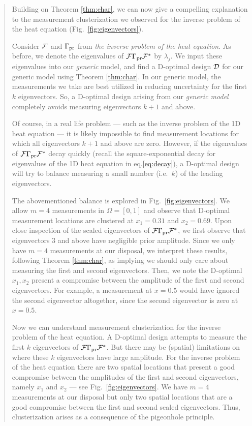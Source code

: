 \begin{quote}
  Building on Theorem \ref{thm:char}, we can now give a compelling
  explanation to the measurement clusterization we observed for the
  inverse problem of the heat equation (Fig.~\ref{fig:eigenvectors}).
    
  Consider $\mathcal{F}$ and $\Gamma_{\textup{pr}}$ from \emph{the inverse problem of the
  heat equation}. As before, we denote the eigenvalues of
  $\mathcal{F}\Gamma_{\textup{pr}}\mathcal{F}^*$ by $\lambda_j$. We input these eigenvalues into
  our \emph{generic} model, and find a D-optimal design $\mathcal{D}$ for our
  generic model using Theorem \ref{thm:char}. In our generic model,
  the measurements we take are best utilized in reducing uncertainty
  for the first $k$ eigenvectors. So, a D-optimal design arising from
  our \emph{generic model} completely avoids measuring eigenvectors
  $k+1$ and above.

  Of course, in a real life problem --- such as the inverse problem of
  the 1D heat equation --- it is likely impossible to find measurement
  locations for which all eigenvectors $k+1$ and above are
  zero. However, if the eigenvalues of $\mathcal{F}\Gamma_{\textup{pr}}\mathcal{F}^*$ decay
  quickly (recall the square-exponential decay for eigenvalues of the
  1D heat equation in eq.\eqref{eq:decay}), a D-optimal design will
  try to balance measuring a small number (i.e.~$k$) of the leading
  eigenvectors.

  The abovementioned balance is explored in
  Fig.~\ref{fig:eigenvectors}. We allow $m=4$ measurements in $\Omega
  = [0,1]$ and observe that D-optimal measurement locations are
  clustered at $x_1 = 0.31$ and $x_2 = 0.69$. Upon close inspection of
  the scaled eigenvectors of $\mathcal{F} \Gamma_{\textup{pr}} \mathcal{F}^*$, we first observe
  that eigenvectors $3$ and above have negligible prior
  amplitude. Since we only have $m=4$ measurements at our disposal, we
  interpret these results, following Theorem \ref{thm:char}, as
  implying we should only care about measuring the first and second
  eigenvectors. Then, we note the D-optimal $x_1,x_2$ present a
  compromise between the amplitude of the first and second
  eigenvectors. For example, a measurement at $x=0.5$ would have
  ignored the second eigenvector altogether, since the second
  eigenvector is zero at $x=0.5$.

  Now we can understand measurement clusterization for the inverse
  problem of the heat equation. A D-optimal design attempts to measure
  the first $k$ eigenvectors of $\mathcal{F} \Gamma_{\textup{pr}} \mathcal{F}^*$. But there may be
  (spatial) limitations on where these $k$ eigenvectors have large
  amplitude. For the inverse problem of the heat equation there are
  two spatial locations that present a good compromise between the
  amplitudes of the first and second eigenvectors, namely $x_1$ and
  $x_2$ --- see Fig.~\ref{fig:eigenvectors}. We have $m=4$
  measurements at our disposal but only two spatial locations that are
  a good compromise between the first and second scaled
  eigenvectors. Thus, clusterization arises as a consequence of the
  pigeonhole principle.

\end{quote}
